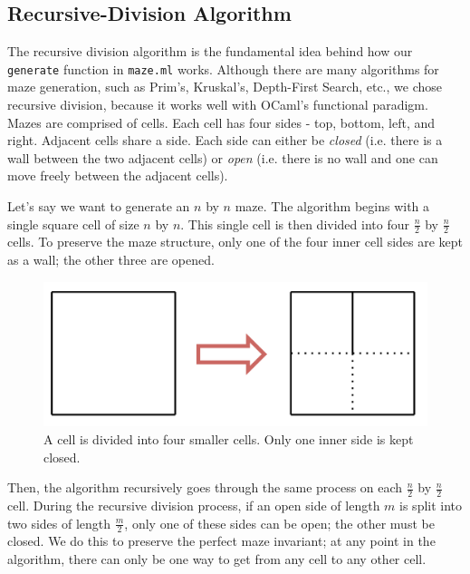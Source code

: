 \documentclass[11pt, margin=1in]{article}
\newcommand{\tab}{\par \qquad}
\begin{document}
\subsection{Recursive-Division Algorithm}  %
The recursive division algorithm is the fundamental idea behind how our \texttt{generate} function in \texttt{maze.ml} works.  Although there are many algorithms for maze generation, such as Prim's, Kruskal's, Depth-First Search, etc., we chose recursive division, because it works well with OCaml's functional paradigm.  Mazes are comprised of cells.  Each cell has four sides - top, bottom, left, and right.  Adjacent cells share a side.  Each side can either be \emph{closed} (i.e. there is a wall between the two adjacent cells) or \emph{open} (i.e. there is no wall and one can move freely between the adjacent cells).  
\tab Let's say we want to generate an $n$ by $n$ maze.  The algorithm begins with a single square cell of size $n$ by $n$.   This single cell is then divided into four $\frac{n}{2}$ by $\frac{n}{2}$ cells.  To preserve the maze structure, only one of the four inner cell sides are kept as a wall; the other three are opened.    

\begin{figure}[H]
\begin{center}
\includegraphics[scale=0.7]{gen1.jpg}
\end{center}
\caption{A cell is divided into four smaller cells.  Only one inner side is kept closed.}
\end{figure}     


Then, the algorithm recursively goes through the same process on each $\frac{n}{2}$ by $\frac{n}{2}$ cell.  During the recursive division process, if an open side of length $m$ is split into two sides of length $\frac{m}{2}$, only one of these sides can be open; the other must be closed.  We do this to preserve the perfect maze invariant; at any point in the algorithm, there can only be one way to get from any cell to any other cell.              
\end{document}
